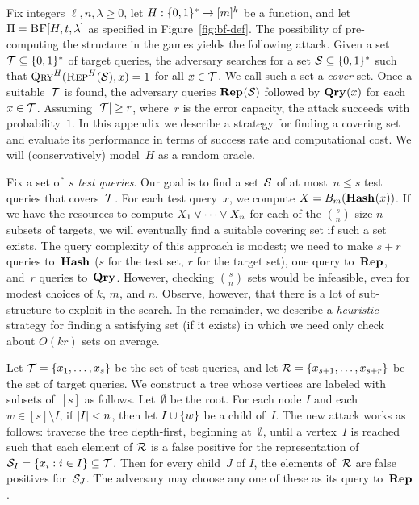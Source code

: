 \label{app:unsalted-attack}
Fix integers $\ell, n, \lambda \geq0$, let $H:\{0,1\}^*\to[m]^k$ be a function,  and let
$\Pi = \textnormal{\textsc{BF}}[H,t,\lambda]$ as specified in Figure~\ref{fig:bf-def}.
%
The possibility of pre-computing the structure in the  games yields the
following attack. Given a set $\mathcal{T}\subseteq\{0,1\}^*$ of target queries, the
adversary searches for a set $\mathcal{S}\subseteq\{0,1\}^*$ such that
$\textnormal{\textsc{Qry}}^H(\textnormal{\textsc{Rep}}^H(\mathcal{S}), x) = 1$ for all $x \in \mathcal{T}$. We call such a set a
\emph{cover} set.
%
Once a suitable~$\mathcal{T}$ is found, the adversary queries $\textup{\textbf{Rep}}\hspace{0.5pt}(\mathcal{S})$ followed
by $\textup{\textbf{Qry}}\hspace{0.5pt}(x)$ for each $x\in\mathcal{T}$.
%
Assuming $|\mathcal{T}| \geq r$, where~$r$ is the error capacity, the attack succeeds
with probability~$1$.
%
In this appendix we describe a strategy for finding a covering set and evaluate
its performance in terms of success rate and computational cost. We will
(conservatively) model~$H$ as a random oracle.

Fix a set of~$s$ \emph{test queries}. Our goal is to find a set~$\mathcal{S}$ of at
most~$n \leq s$ test queries that covers~$\mathcal{T}$.
%
For each test query~$x$, we compute $X = {B}_m(\textup{\textbf{Hash}}\hspace{0.5pt}(x))$. If we have the
resources to compute $X_1 \vee \cdots \vee X_n$ for each of the ${s}\choose{n}$
size-$n$ subsets of targets, we will eventually find a suitable covering set if
such a set exists.
%
The query complexity of this approach is modest; we need to make $s+r$ queries
to~$\textup{\textbf{Hash}}\hspace{0.5pt}$ ($s$ for the test set, $r$ for the target set), one query
to~$\textup{\textbf{Rep}}\hspace{0.5pt}$, and~$r$ queries to~$\textup{\textbf{Qry}}\hspace{0.5pt}$. However, checking $\binom{s}{n}$ sets
would be infeasible, even for modest choices of $k$, $m$, and $n$. Observe,
however, that there is a lot of sub-structure to exploit in the search.
%
In the remainder, we describe a \emph{heuristic} strategy for finding a
satisfying set (if it exists) in which we need only check about $O(kr)$ sets on
average.

Let $\mathcal{T} = \{x_1, \ldots, x_s\}$ be the set of test queries, and let $\mathcal{R} =
\{x_{s+1}, \ldots, x_{s+r}\}$ be the set of target queries.
%
We construct a tree whose vertices are labeled with subsets of~$[s]$ as follows.
%
Let~$\emptyset$ be the root.
%
For each node $I$ and each $w \in [s] \setminus I$, if $|I| < n$, then let $I
\cup \{ w \}$ be a child of~$I$.
%
The new attack works as follows: traverse the tree depth-first, beginning
at~$\emptyset$, until a vertex~$I$ is reached such that each element of $\mathcal{R}$ is
a false positive for the representation of $\mathcal{S}_I = \{ x_i : i \in I \}
\subseteq \mathcal{T}$.
%
Then for every child~$J$ of $I$, the elements of~$\mathcal{R}$ are false positives
for~$\mathcal{S}_J$. The adversary may choose any one of these as its query
to~$\textup{\textbf{Rep}}\hspace{0.5pt}$.

